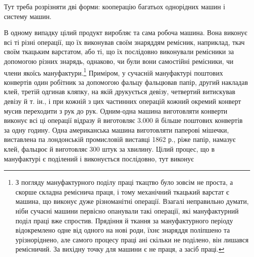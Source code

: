 Тут треба розрізняти дві форми: кооперацію багатьох однорідних
машин і систему машин.

В одному випадку цілий продукт виробляє та сама робоча
машина. Вона виконує всі ті різні операції, що їх виконував своїм
знаряддям ремісник, наприклад, ткач своїм ткацьким варстатом,
або ті, що їх послідовно виконували ремісники за допомогою
різних знарядь, однаково, чи були вони самостійні ремісники,
чи члени якоїсь мануфактури.\footnote{
З погляду мануфактурного поділу праці ткацтво було зовсім не
проста, а скорше складна реміснича праця, і тому механічний ткацький
варстат є машина, що виконує дуже різноманітні операції. Взагалі неправильно
думати, ніби сучасні машини первісно опанували такі операції,
які мануфактурний поділ праці вже спростив. Прядіння й ткання за мануфактурного
періоду відокремлено одне від одного на нові роди, їхнє знаряддя
поліпшено та урізноріднено, але самого процесу праці ані скільки
не поділено, він лишався ремісничий. За вихідну точку для машини є не
праця, а засіб праці.
} Приміром, у сучасній мануфактурі
поштових конвертів один робітник за допомогою фальцу
фальцював папір, другий накладав клей, третій одгинав кляпку,
на якій друкується девізу, четвертий витискував девізу й т. ін.,
і при кожній з цих частинних операцій кожний окремий конверт
мусив переходити з рук до рук. Одним-одна машина виготовляти
конверти виконує всі ці операції відразу й виготовляє 3.000 й
більше поштових конвертів за одну годину. Одна американська
машина виготовляти паперові мішечки, виставлена па лондонській
промисловій виставці 1862 р., ріже папір, намазує клей,
фальцює й виготовляє 300 штук за хвилину. Цілий процес, що в
мануфактурі є поділений і виконується послідовно, тут виконує
\parbreak{}  %
